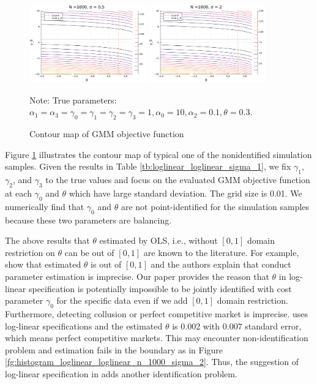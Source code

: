\documentclass[11pt, a4paper]{article}
\begin{document}
\begin{figure}[!htbp]
  \begin{center}
  \includegraphics[width = 0.45\textwidth]
  {figuretable/contour_loglinear_loglinear_n_1000_sigma_0.5.pdf}
  \includegraphics[width = 0.45\textwidth]
  {figuretable/contour_loglinear_loglinear_n_1000_sigma_2.pdf}
  \caption{Contour map of GMM objective function}
  \label{fg:contour_loglinear_loglinear_n_1000_sigma_2} 
  \end{center}
  \footnotesize
  Note: True parameters: $\alpha_1 = \alpha_3 = \gamma_0 = \gamma_1 = \gamma_2  = \gamma_3 = 1, \alpha_0 = 10, \alpha_2 = 0.1,  \theta = 0.3.$
\end{figure} 



Figure \ref{fg:contour_loglinear_loglinear_n_1000_sigma_2} illustrates the contour map of typical one of the nonidentified simulation samples. Given the results in Table \ref{tb:loglinear_loglinear_sigma_1}, we fix $\gamma_1$, $\gamma_2$, and $\gamma_3$ to the true values and focus on the evaluated GMM objective function at each $\gamma_0$ and $\theta$ which have large standard deviation. 
The grid size is 0.01.
We numerically find that $\gamma_0$ and $\theta$ are not point-identified for the simulation samples because these two parameters are balancing.

The above results that $\theta$ estimated by OLS, i.e., without $[0,1]$ domain restriction on $\theta$ can be out of $[0,1]$ are known to the literature. For example, \cite{okazaki2022excess} show that estimated $\theta$ is out of $[0,1]$ and the authors explain that conduct parameter estimation is imprecise. Our paper provides the reason that $\theta$ in log-linear specification is potentially impossible to be jointly identified with cost parameter $\gamma_0$ for the specific data even if we add $[0,1]$ domain restriction. Furthermore, detecting collusion or perfect competitive market is imprecise. \cite{merel2009measuring} uses log-linear specifications and the estimated $\theta$ is 0.002 with 0.007 standard error, which means perfect competitive markets. This may encounter non-identification problem and estimation fails in the boundary as in Figure \ref{fg:histogram_loglinear_loglinear_n_1000_sigma_2}. Thus, the suggestion of log-linear specification in \cite{perloff2012collinearity} adds another identification problem. 
\end{document}
